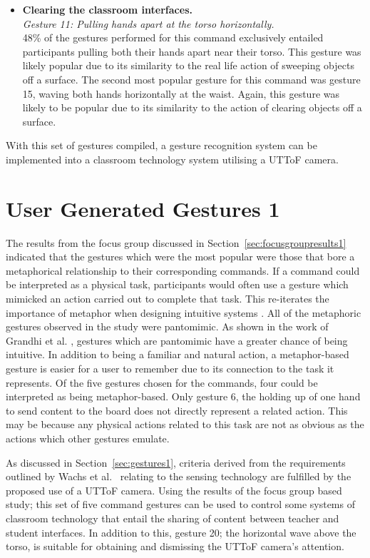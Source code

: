 \documentclass[manuscript, review, screen]{acmart}
\begin{document}
\begin{itemize}
\item \textbf{Clearing the classroom interfaces.}\\
\textit{Gesture 11: Pulling hands apart at the torso horizontally.}\\
48\% of the gestures performed for this command exclusively entailed participants pulling both their hands apart near their torso.
This gesture was likely popular due to its similarity to the real life action of sweeping objects off a surface.
The second most popular gesture for this command was gesture 15, waving both hands horizontally at the waist.
Again, this gesture was likely to be popular due to its similarity to the action of clearing objects off a surface.\\
\end{itemize}

With this set of gestures compiled, a gesture recognition system can be implemented into a classroom technology system utilising a \ac{UTToF} camera.


\section{User Generated Gestures 1}
\label{sec:discussion1}

The results from the focus group discussed in Section~\ref{sec:focusgroupresults1} indicated that the gestures which were the most popular were those that bore a metaphorical relationship to their corresponding commands.
If a command could be interpreted as a physical task, participants would often use a gesture which mimicked an action carried out to complete that task.
This re-iterates the importance of metaphor when designing intuitive systems \cite{Wang2008}.
All of the metaphoric gestures observed in the study were pantomimic.
As shown in the work of Grandhi et al. \citeyearpar{Grandhi2011}, gestures which are pantomimic have a greater chance of being intuitive.
In addition to being a familiar and natural action, a metaphor-based gesture is easier for a user to remember due to its connection to the task it represents.
Of the five gestures chosen for the commands, four could be interpreted as being metaphor-based.
Only gesture 6, the holding up of one hand to send content to the board does not directly represent a related action.
This may be because any physical actions related to this task are not as obvious as the actions which other gestures emulate.

As discussed in Section~\ref{sec:gestures1}, criteria derived from the requirements outlined by Wachs et al.~\citeyearpar{Wachs2011} relating to the sensing technology are fulfilled by the proposed use of a \ac{UTToF} camera.
Using the results of the focus group based study; this set of five command gestures can be used to control some systems of classroom technology that entail the sharing of content between teacher and student interfaces.
In addition to this, gesture 20; the horizontal wave above the torso, is suitable for obtaining and dismissing the \ac{UTToF} camera's attention.
\end{document}
